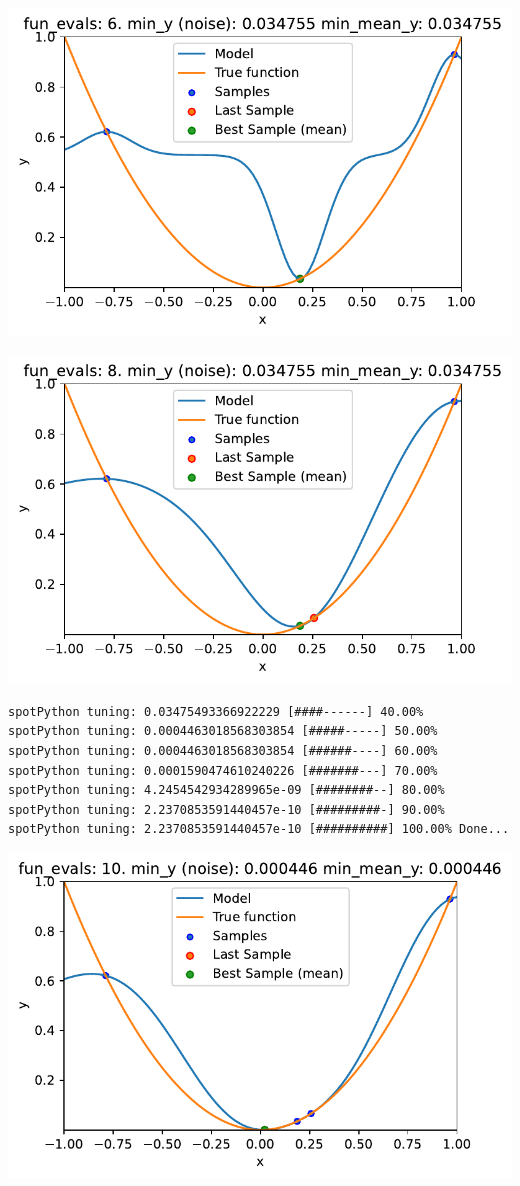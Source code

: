 \documentclass[
  letterpaper,
  DIV=11,
  numbers=noendperiod]{scrreprt}
\begin{document}
\includegraphics{014_num_spot_ocba_files/figure-pdf/cell-6-output-1.pdf}

\includegraphics{014_num_spot_ocba_files/figure-pdf/cell-6-output-2.pdf}

\begin{verbatim}
spotPython tuning: 0.03475493366922229 [####------] 40.00% 
spotPython tuning: 0.0004463018568303854 [#####-----] 50.00% 
spotPython tuning: 0.0004463018568303854 [######----] 60.00% 
spotPython tuning: 0.0001590474610240226 [#######---] 70.00% 
spotPython tuning: 4.2454542934289965e-09 [########--] 80.00% 
spotPython tuning: 2.2370853591440457e-10 [#########-] 90.00% 
spotPython tuning: 2.2370853591440457e-10 [##########] 100.00% Done...
\end{verbatim}

\includegraphics{014_num_spot_ocba_files/figure-pdf/cell-6-output-4.pdf}
\end{document}
